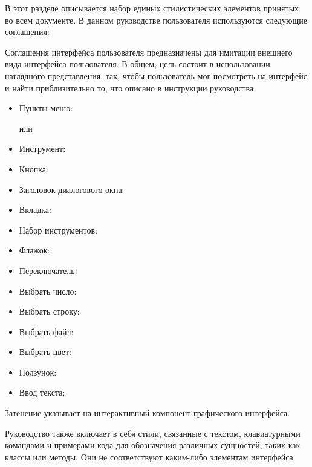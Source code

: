 \label{label_conventions}

В этот разделе описывается набор единых стилистических элементов
принятых во всем документе. В данном руководстве пользователя
используются следующие соглашения:


Соглашения интерфейса пользователя предназначены для имитации внешнего
вида интерфейса пользователя. В общем, цель состоит в использовании
наглядного представления, так, чтобы пользователь мог посмотреть на
интерфейс и найти приблизительно то, что описано в инструкции
руководства.

\begin{itemize}[label=--,itemsep=5pt]
\item Пункты меню:  \arrow
{}

или

 \arrow
{} \arrow {}
\item Инструмент: 
\item Кнопка: 
\item Заголовок диалогового окна: 
\item Вкладка: 
\item Набор инструментов: 
\item Флажок: 
\item Переключатель:  
\item Выбрать число: 
\item Выбрать строку: 
\item Выбрать файл: \browsebutton
\item Выбрать цвет: 
\item Ползунок: 
\item Ввод текста: 
\end{itemize}
Затенение указывает на интерактивный компонент графического интерфейса.


Руководство также включает в себя стили, связанные с текстом,
клавиатурными командами и примерами кода для обозначения различных
сущностей, таких как классы или методы. Они не соответствуют каким-либо
элементам интерфейса.

